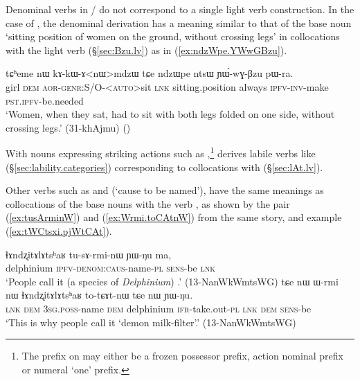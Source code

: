Denominal verbs in / do not correspond to a single light verb construction. In the case of , the denominal derivation has a meaning similar to that of the base noun  `sitting position of women on the ground, without crossing legs' in collocations with the light verb  (§\ref{sec:Bzu.lv}) as in (\ref{ex:ndzWpe.YWwGBzu}).

\begin{exe}
\ex \label{ex:ndzWpe.YWwGBzu}
 \gll tɕʰeme nɯ kɤ-kɯ-ɤ<nɯ>mdzɯ tɕe ndzɯpe ntsɯ ɲɯ́-wɣ-βzu pɯ-ra. \\
 girl \textsc{dem} \textsc{aor}-\textsc{genr}:S/O-<\textsc{auto}>sit \textsc{lnk} sitting.position always \textsc{ipfv}-\textsc{inv}-make \textsc{pst}.\textsc{ipfv}-be.needed \\
 \glt `Women, when they sat, had to sit with both legs folded on one side, without crossing legs.' (31-khAjmu)
()
\end{exe}

With nouns expressing striking actions such as ,\footnote{The  prefix on   may either be a frozen possessor prefix, action nominal prefix or numeral `one' prefix. }   derives labile verbs like  (§\ref{sec:lability.categories}) corresponding to collocations with  (§\ref{sec:lAt.lv}).


Other verbs such as  and  (`cause to be named'), have the same meanings as collocations of the base nouns with the verb , as shown by the pair  (\ref{ex:tusArminW}) and (\ref{ex:Wrmi.toCAtnW}) from the same story, and example (\ref{ex:tWCtsxi.pjWtCAt}).

\begin{exe}
\ex 
\begin{xlist}
\ex \label{ex:tusArminW}
 \gll ɬɤndʐitɤlɤtsʰaʁ tu-sɤ-rmi-nɯ ɲɯ-ŋu ma, \\
 delphinium \textsc{ipfv}-\textsc{denom}:\textsc{caus}-name-\textsc{pl} \textsc{sens}-be \textsc{lnk} \\
\glt `People call it (a species of \textit{Delphinium})  .' (13-NanWkWmtsWG)
\ex \label{ex:Wrmi.toCAtnW}
 \gll  tɕe nɯ ɯ-rmi nɯ ɬɤndʐitɤlɤtsʰaʁ to-tɕɤt-nɯ tɕe nɯ ɲɯ-ŋu. \\
 \textsc{lnk} \textsc{dem} \textsc{3sg}.\textsc{poss}-name \textsc{dem} delphinium \textsc{ifr}-take.out-\textsc{pl} \textsc{lnk} \textsc{dem} \textsc{sens}-be \\
\glt `This is why people call it  `demon milk-filter'.' (13-NanWkWmtsWG)
\end{xlist}
\end{exe}

